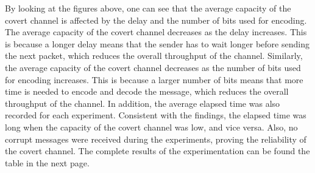 \documentclass[10pt,a4paper]{article}
\begin{document}
By looking at the figures above, one can see that the average capacity of the covert channel is affected by the delay and the number of bits used for encoding.
The average capacity of the covert channel decreases as the delay increases. This is because a longer delay means that the sender has to wait longer before sending the next packet, which reduces the overall throughput of the channel.
Similarly, the average capacity of the covert channel decreases as the number of bits used for encoding increases. This is because a larger number of bits means that more time is needed to encode and decode the message, which reduces the overall throughput of the channel.
In addition, the average elapsed time was also recorded for each experiment. Consistent with the findings, the elapsed time was long when the capacity of the covert channel was low, and vice versa. Also, no corrupt messages were received during the experiments, proving the reliability of the covert channel. The complete results of the experimentation can be found the table in the next page.
\end{document}
